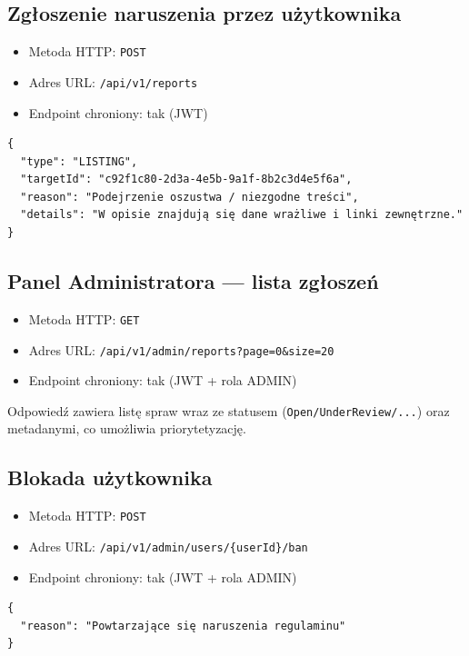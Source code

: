 \documentclass[11pt, a4paper]{article}
\begin{document}
\subsection{Zgłoszenie naruszenia przez użytkownika}
\begin{itemize}
    \item Metoda HTTP: \texttt{POST}
    \item Adres URL: \texttt{/api/v1/reports}
    \item Endpoint chroniony: tak (JWT)
\end{itemize}

\begin{lstlisting}[style=json,caption={Ciało żądania — zgłoszenie naruszenia}]
{
  "type": "LISTING", 
  "targetId": "c92f1c80-2d3a-4e5b-9a1f-8b2c3d4e5f6a",
  "reason": "Podejrzenie oszustwa / niezgodne treści",
  "details": "W opisie znajdują się dane wrażliwe i linki zewnętrzne."
}
\end{lstlisting}

\subsection{Panel Administratora — lista zgłoszeń}
\begin{itemize}
    \item Metoda HTTP: \texttt{GET}
    \item Adres URL: \texttt{/api/v1/admin/reports?page=0\&size=20}
    \item Endpoint chroniony: tak (JWT + rola ADMIN)
\end{itemize}

\noindent Odpowiedź zawiera listę spraw wraz ze statusem (\texttt{Open/UnderReview/...}) oraz metadanymi, co umożliwia priorytetyzację.

\subsection{Blokada użytkownika}
\begin{itemize}
    \item Metoda HTTP: \texttt{POST}
    \item Adres URL: \texttt{/api/v1/admin/users/\{userId\}/ban}
    \item Endpoint chroniony: tak (JWT + rola ADMIN)
\end{itemize}

\begin{lstlisting}[style=json,caption={Ciało żądania — blokada użytkownika}]
{
  "reason": "Powtarzające się naruszenia regulaminu"
}
\end{lstlisting}
\end{document}
